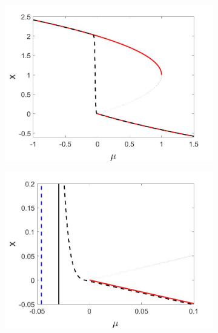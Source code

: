 \begin{figure}[H]
\centering
\begin{subfigure}{.5\textwidth}
  \centering
  \includegraphics[width=\linewidth]{oneD/slow_bif_diagram.jpg}
  \caption{}
\end{subfigure}%
\begin{subfigure}{.5\textwidth}
  \centering
  \includegraphics[width=\linewidth]{oneD/slow_bif_diagram_zoom.jpg}
  \caption{}
\end{subfigure}
\begin{subfigure}{.5\textwidth}
\centering

\end{subfigure}
\end{figure}
